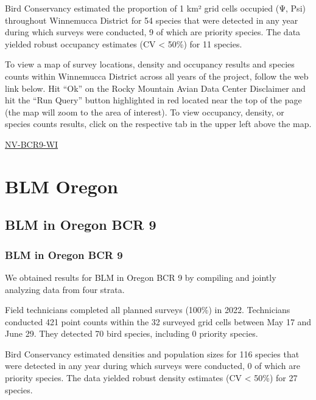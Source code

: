 \documentclass[
  letterpaper,
  DIV=11,
  numbers=noendperiod,
  oneside]{scrreprt}
\begin{document}
Bird Conservancy estimated the proportion of 1 km² grid cells occupied
(Ψ, Psi) throughout Winnemucca District for 54 species that were
detected in any year during which surveys were conducted, 9 of which are
priority species. The data yielded robust occupancy estimates (CV
\textless{} 50\%) for 11 species.

To view a map of survey locations, density and occupancy results and
species counts within Winnemucca District across all years of the
project, follow the web link below. Hit ``Ok'' on the Rocky Mountain
Avian Data Center Disclaimer and hit the ``Run Query'' button
highlighted in red located near the top of the page (the map will zoom
to the area of interest). To view occupancy, density, or species counts
results, click on the respective tab in the upper left above the map.

\href{http://www.rmbo.org/new_site/adc/QueryWindow.aspx\#N4IgzgLgTghhCuBbEAuABCAcgNQLQCEBhAJQE5cB1ASXX3igFMZ40B7AMzQBkYA7AEzQBZPjADmDRA14Q0uNBQCWvXpPgBjdTDQARRZCiL1EEAF8gA==}{NV-BCR9-WI}

\hypertarget{blm-oregon}{%
\section{BLM Oregon}\label{blm-oregon}}

\hypertarget{blm-in-oregon-bcr-9}{%
\subsection{BLM in Oregon BCR 9}\label{blm-in-oregon-bcr-9}}

\hypertarget{blm-in-oregon-bcr-9-1}{%
\subsubsection{BLM in Oregon BCR 9}\label{blm-in-oregon-bcr-9-1}}

We obtained results for BLM in Oregon BCR 9 by compiling and jointly
analyzing data from four strata.

Field technicians completed all planned surveys (100\%) in 2022.
Technicians conducted 421 point counts within the 32 surveyed grid cells
between May 17 and June 29. They detected 70 bird species, including 0
priority species.

Bird Conservancy estimated densities and population sizes for 116
species that were detected in any year during which surveys were
conducted, 0 of which are priority species. The data yielded robust
density estimates (CV \textless{} 50\%) for 27 species.
\end{document}
